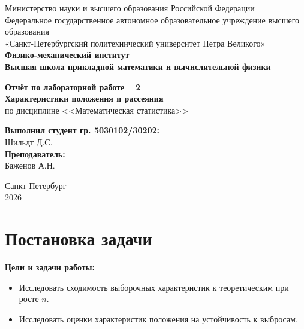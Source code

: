 \documentclass[a4paper, 14pt]{extarticle}
\begin{document}
\begin{titlepage}
    \begin{center}
        Министерство науки и высшего образования Российской Федерации\\
        Федеральное государственное автономное образовательное учреждение высшего образования\\
        «Санкт-Петербургский политехнический университет Петра Великого»\\
        
        \textbf{Физико-механический институт}\\
        \textbf{Высшая школа прикладной математики и вычислительной физики}
    \end{center}

    \vfill
    
    \begin{center}
        \textbf{Отчёт по лабораторной работе \textnumero~ 2\\[0.5cm]}
        \textbf{Характеристики положения и рассеяния\\}
        по дисциплине <<Математическая статистика>>
    \end{center}

    \vfill

    \hfill
    \begin{minipage}{0.45\textwidth}
        \textbf{Выполнил студент гр. 5030102/30202:}\\
        Шильдт Д.С.\\[0.5cm]
        \textbf{Преподаватель:}\\ 
        Баженов А.Н.
    \end{minipage}

    \vfill

    \begin{center}
        Санкт-Петербург\\2026
    \end{center}
\end{titlepage}

\setcounter{page}{2}

\tableofcontents
\newpage

\section{Постановка задачи}

\textbf{Цели и задачи работы:}
\begin{itemize}
    \item Исследовать сходимость выборочных характеристик к теоретическим при росте $n$.
    \item Исследовать оценки характеристик положения на устойчивость к выбросам.
\end{itemize}
\end{document}
